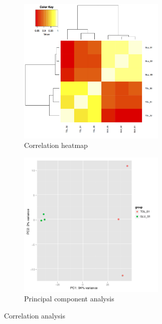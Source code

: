 \documentclass[12pt, a4paper]{report}
\begin{document}
%
%

\begin{figure}[H]
	\centering
	\begin{subfigure}{0.4\textwidth}
		\includegraphics[width=200pt]{pics/heatmap2}
		\caption{Correlation heatmap} \label{fig:heatmap}
	\end{subfigure}
	\hspace*{1cm} 
	\begin{subfigure}{0.5\textwidth}
		\includegraphics[width=200pt]{pics/PCA2.png}
		\caption{Principal component analysis} \label{fig:pca}
	\end{subfigure}
	\hspace*{\fill} %
	\caption{Correlation analysis} \label{fig:1}
\end{figure}
\end{document}
